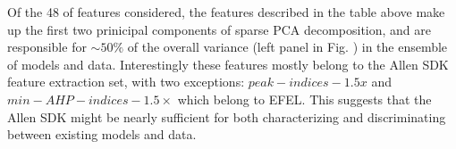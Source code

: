   
  



Of the 48 of features considered, the features described in the table above make up the first two prinicipal components of sparse PCA decomposition, and are responsible for $\sim 50\%$ of the overall variance (left panel in Fig. \label{fig:pca_data_points}) in the ensemble of models and data.
Interestingly these features mostly belong to the Allen SDK feature extraction set, with two exceptions: $peak-indices-1.5x$  and $min-AHP-indices-1.5 \times$ which belong to EFEL.
This suggests that the Allen SDK might be nearly sufficient for both characterizing and discriminating between existing models and data.

